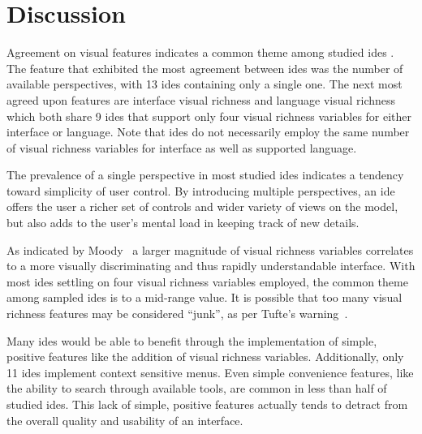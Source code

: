 \section{Discussion}
\label{sec:discussion}


Agreement on visual features indicates a common theme among studied \acp{ide}
. The feature that exhibited the most agreement between \acp{ide} was the 
number of available perspectives, with 13 \acp{ide} containing 
only a single one. The next most agreed upon features are 
interface visual richness and language visual richness which both share 9 
\acp{ide} that support only four visual richness variables for either 
interface or language. Note that \acp{ide} do not necessarily employ the same 
number of visual richness variables for interface as well as supported 
language.

The prevalence of a single perspective in most studied \acp{ide}
indicates a tendency toward simplicity of user control. By introducing
multiple perspectives, an \ac{ide} offers the user a richer set of
controls and wider variety of views on the model, but also adds to the
user's mental load in keeping track of new details.

As indicated by Moody~\cite{moody2009} a larger magnitude of visual
richness variables correlates to a more visually discriminating and thus
rapidly understandable interface. With most \acp{ide} settling on four
visual richness variables employed, the common theme among sampled
\acp{ide} is to a mid-range value. It is possible that too many visual
richness features may be considered ``junk'', as per Tufte's warning~\cite{Tufte2001}.

Many \acp{ide} would be able to benefit through the implementation of
simple, positive features like the addition of visual richness variables.
Additionally, only 11 \acp{ide} implement context
sensitive menus. Even simple convenience features, like the
ability to search through available tools, are common in less than half of
studied \acp{ide}. This lack of simple, positive features actually tends to
detract from the overall quality and usability of an interface.

